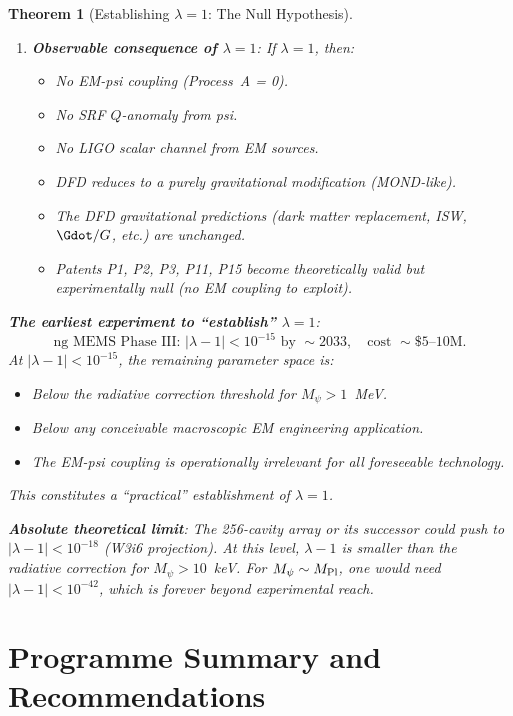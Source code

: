 \documentclass[11pt]{article}
\newcommand{\lam}{\lambda}
\newcommand{\lbone}{|\lam - 1|}
\newtheorem{theorem}{Theorem}[section]
\theoremstyle{definition}
\theoremstyle{remark}
\begin{document}
\begin{theorem}[Establishing $\lambda = 1$: The Null Hypothesis]
\begin{enumerate}
\item \textbf{Observable consequence of $\lambda = 1$}: If
  $\lambda = 1$, then:
  \begin{itemize}[nosep]
  \item No EM-psi coupling (Process~A = 0).
  \item No SRF $Q$-anomaly from psi.
  \item No LIGO scalar channel from EM sources.
  \item DFD reduces to a purely gravitational modification (MOND-like).
  \item The DFD gravitational predictions (dark matter replacement,
    ISW, $\Gdot/G$, etc.) are unchanged.
  \item Patents P1, P2, P3, P11, P15 become theoretically valid but
    experimentally null (no EM coupling to exploit).
  \end{itemize}
\end{enumerate}

\textbf{The earliest experiment to ``establish'' $\lambda = 1$}:
\begin{equation}
\boxed{
\text{ng MEMS Phase~III: } \lbone < 10^{-15} \text{ by } \sim 2033,
\quad \text{cost } \sim \$5\text{--}10\text{M}.
}
\end{equation}
At $\lbone < 10^{-15}$, the remaining parameter space is:
\begin{itemize}[nosep]
\item Below the radiative correction threshold for $M_\psi > 1$~MeV.
\item Below any conceivable macroscopic EM engineering application.
\item The EM-psi coupling is operationally irrelevant for all foreseeable
  technology.
\end{itemize}
This constitutes a ``practical'' establishment of $\lambda = 1$.

\textbf{Absolute theoretical limit}: The 256-cavity array or its
successor could push to $\lbone < 10^{-18}$ (W3i6 projection).
At this level, $\lambda - 1$ is smaller than the radiative correction
for $M_\psi > 10$~keV. For $M_\psi \sim M_{\rm Pl}$, one would need
$\lbone < 10^{-42}$, which is forever beyond experimental reach.
\end{theorem}


\part{Programme Summary and Recommendations}
\label{part:summary}
\end{document}

